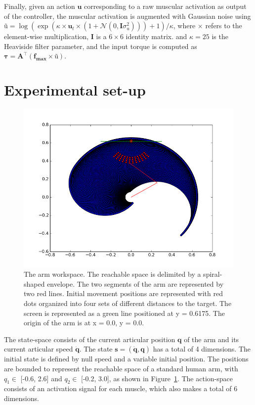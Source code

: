\documentclass[pdftex,a4paper,11pt]{report}
\begin{document}
Finally, given an action $\textbf{u}$ corresponding to a raw muscular activation as output of the
controller, the muscular activation
is augmented with Gaussian noise using $\textbf{\~{u}} = \log(\exp(\kappa \times \textbf{u}_t \times (1+\mathcal{N}(0,\textbf{I}\sigma_u^2))) + 1) / \kappa$, where $\times$ refers to the element-wise multiplication, $\textbf{I}$ is a $6 \times 6$ identity matrix.
and $\kappa = 25$ is the Heaviside filter parameter, and the input torque 
is computed as $\boldsymbol{\tau} = \textbf{A}^\top ( \textbf{f}_\textbf{max} \times \textbf{\~{u}} )$.

\section{Experimental set-up}
\label{sec_ExpSetup}

\begin{figure}[hbt]
\centering
	\includegraphics[width=0.9\columnwidth]{figures/armWorkspace.png}
	\caption{The arm workspace. The reachable space is delimited by a spiral-shaped envelope. The two segments of the arm are represented by two red lines. Initial movement positions are represented with red dots organized into four sets of different distances to the target. The screen is represented as a green line positioned at y = 0.6175. The origin of the arm is at x = 0.0, y = 0.0.}
	\label{fig:arm_workspace}
\end{figure}

The state-space consists of the current articular position $\textbf{q}$ of the arm and its current articular speed $\boldsymbol{\dot{q}}$. The state $\boldsymbol{s = (\dot{q}, q)}$ has a total of 4 dimensions. The initial state is defined by null speed and a variable initial position.
The positions are bounded to represent the reachable space of a standard human arm, with $q_1 \in$ [-0.6, 2.6] and $q_2 \in$ [-0.2, 3.0], as shown in Figure~\ref{fig:arm_workspace}.
The action-space consists of an activation signal for each muscle, which also makes a total of 6 dimensions.
\end{document}
